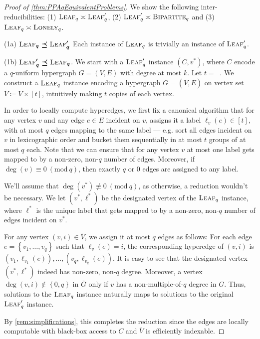 \documentclass[10pt,a4paper]{article}
\theoremstyle{definition}
\theoremstyle{remark}
\newcommand{\contour}[2]{#2}
\newcommand{\inparen}[1]{\left ( #1 \right )}
\renewcommand{\mod}[1]{~\inparen{\mathrm{mod}~#1}}
\def\ceil#1{\mathop{\left\lceil#1\right\rceil}}
\def\set#1{\left\{#1\right\}}
\newcommand{\parasc}[1]{\noindent \contour{black}{#1}}
\newcommand{\qnum}{q}
\newcommand{\leafq}{\ensuremath\textsc{Leaf}_{\qnum}}
\newcommand{\leaf}{\ensuremath\textsc{Leaf}}
\newcommand{\lonely}{\ensuremath\textsc{Lonely}}
\newcommand{\bipartite}{\ensuremath{\textsc{Bipartite}}}
\newcommand{\reducible}{\preceq}
\begin{document}
\begin{proof}[Proof of \autoref{thm:PPAqEquivalentProblems}]
We show the following inter-reducibilities: (1) $\leaf_q \asymp \leaf_q'$, (2) $\leaf_q' \asymp \bipartite_q$ and (3) $\leaf_q \asymp \lonely_q$.

\medskip

\parasc{(1a) $\boldsymbol{\leaf_q \reducible \leaf_q'}$} Each instance of $\leafq$ is trivially an instance of $\leaf'_q$.

\medskip

\parasc{(1b) $\boldsymbol{\leaf'_q \reducible \leafq}$.} We start with a $\leaf'_q$ instance $(C, v^*)$, where $C$ encode a $q$-uniform hypergraph $G = (V, E)$ with degree at most $k$. Let $t = \ceil{k/q}$. We construct a $\leaf_q$ instance encoding a hypergraph $\overline{G} = (\overline{V}, \overline{E})$ on vertex set $\overline{V}\coloneqq V \times [t]$, intuitively making $t$ copies of each vertex.

In order to locally compute hyperedges, we first fix a canonical algorithm that for any vertex $v$ and any edge $e \in E$ incident on $v$, assigns it a label $\ell_v(e) \in [t]$, with at most $q$ edges mapping to the same label --- e.g. sort all edges incident on $v$ in lexicographic order and bucket them sequentially in at most $t$ groups of at most $q$ each. Note that we can ensure that for any vertex $v$ at most one label gets mapped to by a non-zero, non-$q$ number of edges. Moreover, if $\deg(v) \equiv 0 \mod{q}$, then exactly $q$ or $0$ edges are assigned to any label.

We'll assume that $\deg(v^*) \not\equiv 0 \mod{q}$, as otherwise, a reduction wouldn't be necessary. We let $(v^*, \ell^*)$ be the designated vertex of the $\leaf_q$ instance, where $\ell^*$ is the unique label that gets mapped to by a non-zero, non-$q$ number of edges incident on $v^*$.

For any vertex $(v, i) \in \overline{V}$, we assign it at most $q$ edges as follows: For each edge $e = \set{v_1, \ldots, v_q}$ such that $\ell_v(e)=i$, the corresponding hyperedge of $(v,i)$ is ${(v_1, \ell_{v_1}(e)), \ldots, (v_q, \ell_{v_q}(e))}$. It is easy to see that the designated vertex $(v^*, \ell^*)$ indeed has non-zero, non-$q$ degree. Moreover, a vertex $\deg(v,i) \notin \set{0, q}$ in $\overline{G}$ only if $v$ has a non-multiple-of-$q$ degree in $G$. Thus, solutions to the $\leaf_q$ instance naturally maps to solutions to the original $\leaf_q'$ instance.

By \autoref{rem:simplifications}, this completes the reduction since the edges are locally computable with black-box access to $C$ and $\overline{V}$ is efficiently indexable.


\end{proof}
\end{document}
